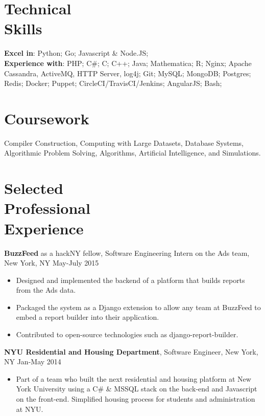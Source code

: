 \documentclass[margin]{res}
\begin{document}
 
\begin{resume}
 
\section{Technical \\ Skills}
{\bf Excel in}: Python; Go; Javascript \& Node.JS; \\
{\bf Experience with}: PHP;  C\#; C; C++; Java; Mathematica; R; Nginx; Apache Cassandra, ActiveMQ, HTTP Server, log4j; Git; MySQL; MongoDB; Postgres; Redis; Docker; Puppet; CircleCI/TravisCI/Jenkins; AngularJS; Bash;

\section{Coursework}
Compiler Construction, Computing with Large Datasets, Database Systems, Algorithmic Problem Solving, Algorithms,  Artificial Intelligence, and Simulations.
 
\section{Selected \\ Professional \\ Experience}

{\bf BuzzFeed} as a hackNY fellow, Software Engineering Intern on the Ads team, New York, NY \hfill May-July 2015
 \begin{itemize} \itemsep -2pt
 \item Designed and implemented the backend of a platform that builds reports from the Ads data. 
\item Packaged the system as a Django extension to allow any team at BuzzFeed to embed a report builder into their application.
 \item Contributed to open-source technologies such as django-report-builder.
 \end{itemize}

{\bf NYU Residential and Housing Department}, Software Engineer, New York, NY \hfill Jan-May 2014
\begin{itemize} \itemsep -2pt
\item Part of a team who built the next residential and housing platform at New York University using a C\# \& MSSQL stack on the back-end and Javascript on the front-end. Simplified housing process for students and administration at NYU.
\end{itemize}
 

\end{resume}
\end{document}
